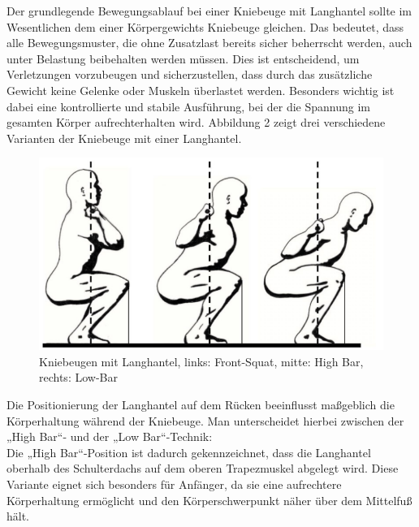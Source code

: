 Der grundlegende Bewegungsablauf bei einer Kniebeuge mit Langhantel sollte im Wesentlichen dem einer Körpergewichts Kniebeuge gleichen. Das bedeutet, dass alle Bewegungsmuster, die ohne Zusatzlast bereits sicher beherrscht werden, auch unter Belastung beibehalten werden müssen. Dies ist entscheidend, um Verletzungen vorzubeugen und sicherzustellen, dass durch das zusätzliche Gewicht keine Gelenke oder Muskeln überlastet werden. Besonders wichtig ist dabei eine kontrollierte und stabile Ausführung, bei der die Spannung im gesamten Körper aufrechterhalten wird. \cite{Meinart} Abbildung 2 zeigt drei verschiedene Varianten der Kniebeuge mit einer Langhantel. 
\\
\begin{figure}[ht]\centering
\includegraphics[width=0.75\linewidth]{images/Langhantel_Kniebeuge.png}
\caption{Kniebeugen mit Langhantel, links: Front-Squat, mitte: High Bar, rechts: Low-Bar \cite{Hartmann2014}}
\label{fig: Langhantel}
\end{figure}
\noindent Die Positionierung der Langhantel auf dem Rücken beeinflusst maßgeblich die Körperhaltung während der Kniebeuge. Man unterscheidet hierbei zwischen der „High Bar“- und der „Low Bar“-Technik:
\\
Die „High Bar“-Position ist dadurch gekennzeichnet, dass die Langhantel oberhalb des Schulterdachs auf dem oberen Trapezmuskel abgelegt wird. Diese Variante eignet sich besonders für Anfänger, da sie eine aufrechtere Körperhaltung ermöglicht und den Körperschwerpunkt näher über dem Mittelfuß hält. \cite{Meinart}

